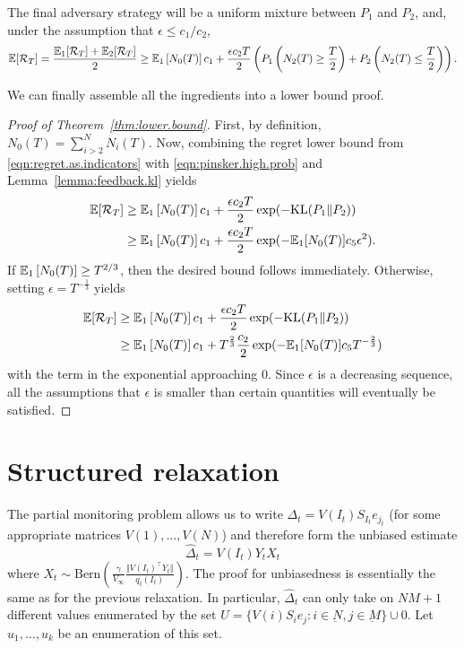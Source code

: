 \documentclass{article}
\newcommand{\KL}{\mathrm{KL}}
\newcommand{\regret}{\mathcal{R}}
\begin{document}
The final adversary strategy will be a uniform mixture between $P_1$ and $P_2$, and, under the assumption that $\epsilon\leq c_1/c_2$,
\begin{equation}
  \label{eqn:regret.as.indicators}
    \ex[\regret_T]
  =
    \frac{\ex_1[\regret_T] + \ex_2[\regret_T]}{2}
  \geq
    \ex_1\left[N_0(T)\right]c_1
    + \frac{\epsilon c_2 T}{2}
    \left(
    P_1\left(N_2(T)\geq \frac{T}{2}\right)
    +    
    P_2\left(N_2(T)\leq\frac{T}{2}\right)
    \right).
  \end{equation}
  
We can finally assemble all the ingredients into a lower bound proof.
\begin{proof}[Proof of Theorem~\ref{thm:lower.bound}]
  First, by definition, $N_0(T) = \sum_{i>2}^N N_i(T)$. Now, combining the regret lower bound from \eqref{eqn:regret.as.indicators} with \eqref{eqn:pinsker.high.prob} and Lemma~\ref{lemma:feedback.kl} yields
\begin{align*}   
  \ex[\regret_T]
&\geq
    \ex_1\left[N_0(T)\right]c_1
    + \frac{\epsilon c_2 T}{2}
  \exp(-\KL(P_1\Vert P_2) )\\
&\geq
      \ex_1\left[N_0(T)\right]c_1
    + \frac{\epsilon c_2 T}{2}
    \exp(- \ex_1[N_0(T)] c_5 \epsilon^2 ).
\end{align*}
If $\mathbb E_1\left[N_0(T)\right] \geq T^{2/3}$, then the desired bound follows immediately. Otherwise, setting $\epsilon = T^{-\frac13}$ yields 
\begin{align*}   
  \ex[\regret_T]
&\geq
    \ex_1\left[N_0(T)\right]c_1
    + \frac{\epsilon c_2 T}{2}
  \exp(-\KL(P_1\Vert P_2) )\\
&\geq
      \ex_1\left[N_0(T)\right]c_1
    +  T^{\frac23}\frac{c_2}{2}
    \exp(- \ex_1[N_0(T)] c_5 T^{-\frac23} )
\end{align*}
with the term in the exponential approaching 0. Since $\epsilon$ is a decreasing sequence, all the assumptions that $\epsilon$ is smaller than certain quantities will eventually be satisfied.
\end{proof}

\section{Structured relaxation}
The partial monitoring problem allows us to write $\Delta_t = V(I_t) S_{I_t} e_{j_t}$ (for some appropriate matrices $V(1),\ldots, V(N)$) and therefore form the unbiased estimate
\[
  \hat\Delta_t = V(I_t) Y_t X_t
\]
where $X_t \sim\text{Bern}\left(\frac{\gamma}{V_\infty} \frac{\Vert V(I_t)^\top Y_t \Vert}{q_t(I_t)}\right)$. The proof for unbiasedness is essentially the same as for the previous relaxation. In particular, $\hat\Delta_t$ can only take on $NM+1$ different values enumerated by the set $U = \{ V(i) S_i e_j: i\in\underbar N, j \in\underbar M\}\cup 0$. Let $u_1,\ldots, u_k$ be an enumeration of this set. 

  
\end{document}
